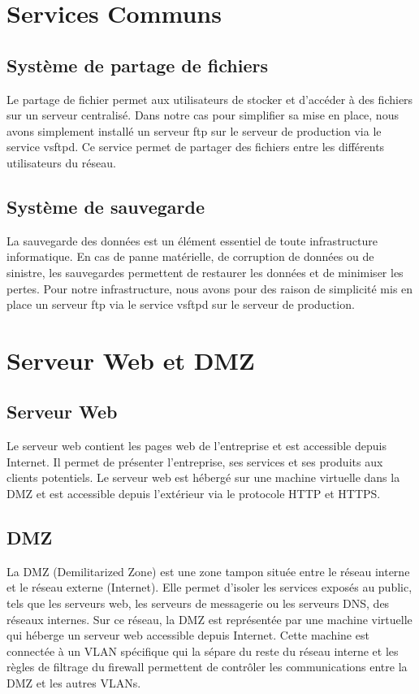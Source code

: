\documentclass[a4paper,12pt]{report}
\begin{document}
\begin{itemize}
        \section{Services Communs}
            \subsection{Système de partage de fichiers}
                Le partage de fichier permet aux utilisateurs de stocker et d'accéder à des fichiers sur un serveur centralisé. Dans notre cas pour simplifier sa mise en place, nous avons simplement installé un serveur ftp sur le serveur de production via le service vsftpd. Ce service permet de partager des fichiers entre les différents utilisateurs du réseau.
            \subsection{Système de sauvegarde}
                La sauvegarde des données est un élément essentiel de toute infrastructure informatique. En cas de panne matérielle, de corruption de données ou de sinistre, les sauvegardes permettent de restaurer les données et de minimiser les pertes. Pour notre infrastructure, nous avons pour des raison de simplicité mis en place un serveur ftp via le service vsftpd sur le serveur de production.
        \section{Serveur Web et DMZ}
            \subsection{Serveur Web}
                Le serveur web contient les pages web de l'entreprise et est accessible depuis Internet. Il permet de présenter l'entreprise, ses services et ses produits aux clients potentiels. Le serveur web est hébergé sur une machine virtuelle dans la DMZ et est accessible depuis l'extérieur via le protocole HTTP et HTTPS.
            \subsection{DMZ}
                La DMZ (Demilitarized Zone) est une zone tampon située entre le réseau interne et le réseau externe (Internet). Elle permet d'isoler les services exposés au public, tels que les serveurs web, les serveurs de messagerie ou les serveurs DNS, des réseaux internes. Sur ce réseau, la DMZ est représentée par une machine virtuelle qui héberge un serveur web accessible depuis Internet. Cette machine est connectée à un VLAN spécifique qui la sépare du reste du réseau interne et les règles de filtrage du firewall permettent de contrôler les communications entre la DMZ et les autres VLANs.

\end{itemize}
\end{document}
